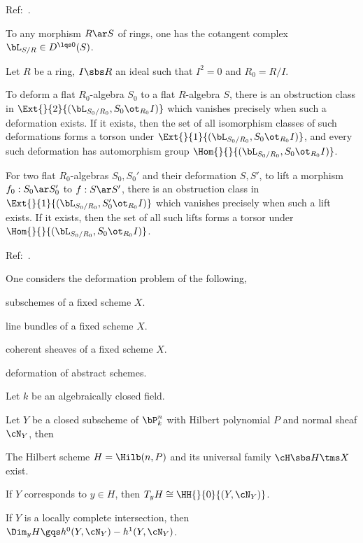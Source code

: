 \documentclass[article, a4paper, twoside]{universal}
\begin{document}
\confighead{}{}{}


Ref:~\cite{Illusie1971,Illusie1972}.

\begin{stp}
	To any morphism $R\ar S$ of rings, one has the cotangent complex $\bL_{S/R}\in D^{\lqs0}(S)$.
\end{stp}

\begin{thm}
	Let $R$ be a ring, $I\sbs R$ an ideal such that $I^{2}=0$ and $R_{0}=R/I$.

	To deform a flat $R_{0}$-algebra $S_{0}$ to a flat $R$-algebra $S$, there is an obstruction class in $\Ext{}{2}{(\bL_{S_{0}/R_{0}},S_{0}\ot_{R_{0}}I)}$ which vanishes precisely when such a deformation exists. If it exists, then the set of all isomorphism classes of such deformations forms a torson under $\Ext{}{1}{(\bL_{S_{0}/R_{0}},S_{0}\ot_{R_{0}}I)}$, and every such deformation has automorphism group $\Hom{}{}{(\bL_{S_{0}/R_{0}},S_{0}\ot_{R_{0}}I)}$.

	For two flat $R_{0}$-algebras $S_{0},S_{0}'$ and their deformation $S,S'$, to lift a morphism $f_{0}:S_{0}\ar S_{0}'$ to $f:S\ar S'$, there is an obstruction class in $\Ext{}{1}{(\bL_{S_{0}/R_{0}},S_{0}'\ot_{R_{0}}I)}$ which vanishes precisely when such a lift exists. If it exists, then the set of all such lifts forms a torsor under $\Hom{}{}{(\bL_{S_{0}/R_{0}},S_{0}\ot_{R_{0}}I)}$.
\end{thm}



Ref:~\cite{Hartshorne2010}.

One considers the deformation problem of the following,
\begin{enr}[label=(\Alph*)]
	\item subschemes of a fixed scheme $X$.
	\item line bundles of a fixed scheme $X$.
	\item coherent sheaves of a fixed scheme $X$.
	\item deformation of abstract schemes.
\end{enr}

\begin{stp}
	Let $k$ be an algebraically closed field.
\end{stp}

\begin{thm}
	Let $Y$ be a closed subscheme of $\bP_{k}^{n}$ with Hilbert polynomial $P$ and normal sheaf $\cN_{Y}$, then
	\begin{itm}
		\item The Hilbert scheme $H=\Hilb(n,P)$ and its universal family $\cH\sbs H\tms X$ exist.
		\item If $Y$ corresponds to $y\in H$, then $T_{y}H\cong\HH{}{0}{(Y,\cN_{Y})}$.
		\item If $Y$ is a locally complete intersection, then $\Dim_{y}H\gqs h^{0}(Y,\cN_{Y})-h^{1}(Y,\cN_{Y})$.
	\end{itm}
\end{thm}
\end{document}
